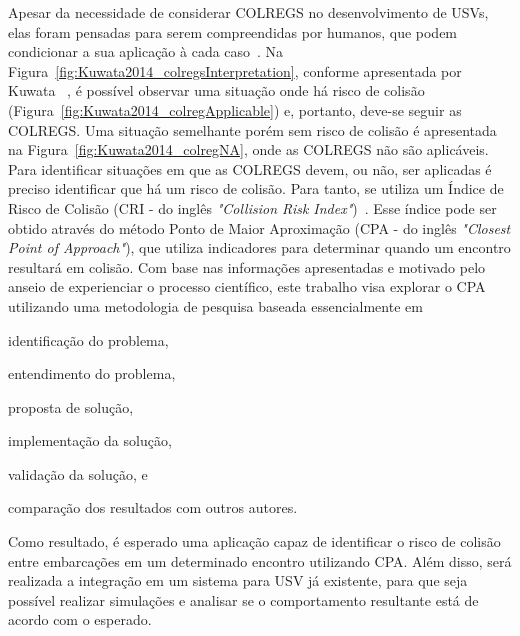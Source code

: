     Apesar da necessidade de considerar COLREGS no desenvolvimento de USVs, elas foram pensadas para serem compreendidas por humanos, que podem condicionar a sua aplicação à cada caso~\cite{KUWATA2014110}. Na Figura~\ref{fig:Kuwata2014_colregsInterpretation}, conforme apresentada por Kuwata \etal~\cite{KUWATA2014110}, é possível observar uma situação onde há risco de colisão (Figura~\ref{fig:Kuwata2014_colregApplicable}) e, portanto, deve-se seguir as COLREGS. Uma situação semelhante porém sem risco de colisão é apresentada na Figura~\ref{fig:Kuwata2014_colregNA}, onde as COLREGS não são aplicáveis. Para identificar situações em que as COLREGS devem, ou não, ser aplicadas é preciso identificar que há um risco de colisão. Para tanto, se utiliza um Índice de Risco de Colisão (CRI - do inglês \textit{"Collision Risk Index"})~\cite{HUANG2019142}. Esse índice pode ser obtido através do método Ponto de Maior Aproximação (CPA - do inglês \textit{"Closest Point of Approach"}), que utiliza indicadores para determinar quando um encontro resultará em colisão. Com base nas informações apresentadas e motivado pelo anseio de experienciar o processo científico, este trabalho visa explorar o CPA utilizando uma metodologia de pesquisa baseada essencialmente em 
    \begin{enumerate*}[label=\alph*)]
        \item identificação do problema,
        \item entendimento do problema,
        \item proposta de solução,
        \item implementação da solução,
        \item validação da solução, e
        \item comparação dos resultados com outros autores.
    \end{enumerate*}
    Como resultado, é esperado uma aplicação capaz de identificar o risco de colisão entre embarcações em um determinado encontro utilizando CPA.
    Além disso, será realizada a integração em um sistema para USV já existente, para que seja possível realizar simulações e analisar se o comportamento resultante está de acordo com o esperado. 
    
